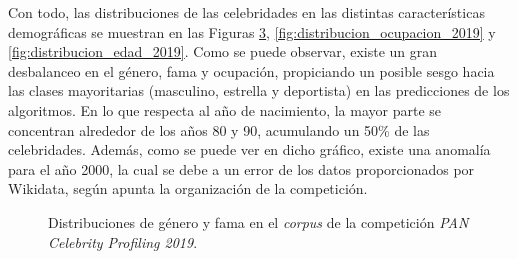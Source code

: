 \bigskip
Con todo, las distribuciones de las celebridades en las distintas características demográficas se muestran en las Figuras \ref{fig:distribuciones_genero_fama_2019},
\ref{fig:distribucion_ocupacion_2019} y \ref{fig:distribucion_edad_2019}. Como se puede observar, existe un gran desbalanceo
en el género, fama y ocupación, propiciando un posible sesgo hacia las clases mayoritarias (masculino, estrella y deportista) en las predicciones de los algoritmos.
En lo que respecta al año de nacimiento,
la mayor parte se concentran alrededor de los años 80 y 90, acumulando un 50\% de las celebridades.
Además, como se puede ver en dicho gráfico, existe una anomalía
para el año 2000, la cual se debe a un error de los datos proporcionados por Wikidata, según apunta la organización de la competición.

\bigskip
\begin{figure}[H]
	\centering
	\begin{subfigure}{0.5\textwidth}
		\label{fig:distribucion_genero_2019}
	\end{subfigure}%
	\hfill
	\begin{subfigure}{0.5\textwidth}
		\label{fig:distribucion_fama_2019}
	\end{subfigure}
	\caption{Distribuciones de género y fama en el \textit{corpus} de la competición \textit{PAN Celebrity Profiling 2019}.}
	\label{fig:distribuciones_genero_fama_2019}
\end{figure}


